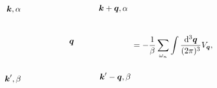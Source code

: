 \begin{equation}
\begin{gathered}
\begin{tikzpicture}[x=0.75pt,y=0.75pt,yscale=-1,xscale=1]
            \draw (117.72,75.78) node [anchor=east] [inner sep=0.75pt]    {$\boldsymbol{k} ,\alpha $};
            \draw (241.22,74.45) node [anchor=west] [inner sep=0.75pt]    {$\boldsymbol{k} +\boldsymbol{q} ,\alpha $};
            \draw (193.48,123.48) node [anchor=north west][inner sep=0.75pt]    {$\boldsymbol{q}$};
            \draw (118.17,187.49) node [anchor=east] [inner sep=0.75pt]    {$\boldsymbol{k} ',\beta $};
            \draw (242.46,184.24) node [anchor=west] [inner sep=0.75pt]    {$\boldsymbol{k} '-\boldsymbol{q} ,\beta $};
            \end{tikzpicture}
    \end{gathered} = - \frac{1}{\beta} \sum_{\omega_n} \int \frac{\dd[3]{\vb*{q}}}{(2\pi)^3} V_{\vb*{q}}  ,
\end{equation}